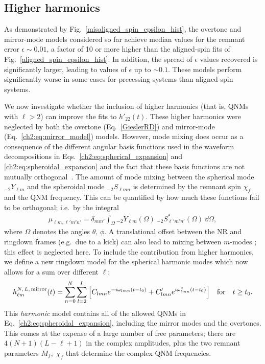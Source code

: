 \subsection{Higher harmonics}\label{kitchen-sink}

As demonstrated by Fig.~\ref{misaligned_spin_epsilon_hist}, %
the overtone and mirror-mode models considered so far achieve median values for the remnant error $\epsilon \sim 0.01$, a factor of 10 or more higher than the aligned-spin fits of Fig.~\ref{aligned_spin_epsilon_hist}. In addition, the spread of $\epsilon$ values recovered is significantly larger, leading to values of $\epsilon$ up to $\sim 0.1$. 
These models perform significantly worse in some cases for precessing systems than aligned-spin systems.

We now investigate whether the inclusion of higher harmonics (that is, QNMs with $\ell > 2$) can improve the fits to $h'_{22}(t)$.
These higher harmonics were neglected by both the overtone (Eq.~\ref{GieslerRD}) and mirror-mode (Eq.~\ref{ch2:eq:mirror_model}) models.
However, mode mixing does occur as a consequence of the different angular basis functions used in the waveform decompositions in Eqs.~\ref{ch2:eq:spherical_expansion} and \ref{ch2:eq:spheroidal_expansion} and the fact that these basis functions are not mutually orthogonal~\cite{Berti:2014fga}.
The amount of mode mixing between the spherical mode ${}_{-2}Y_{\ell m}$ and the spheroidal mode ${}_{-2}S_{\ell m n}$ is determined by the remnant spin $\chi_f$ and the QNM frequency. This can be quantified by how much these functions fail to be orthogonal; i.e.\ by the integral
\begin{align}
     \mu_{\ell m, \ell' m' n'} = \delta_{mm'}\int_{\Omega} {}_{-2}Y_{\ell m}(\Omega)  ~ {}_{-2}S^*_{\ell ' m' n'}(\Omega) ~ \dd{\Omega},
\end{align}
where $\Omega$ denotes the angles $\theta,\,\phi$.
A translational offset between the NR and ringdown frames (e.g.\ due to a kick) can also lead to mixing between $m$-modes \cite{Boyle:2015nqa}; this effect is neglected here.
To include the contribution from higher harmonics, we define a new ringdown model for the spherical harmonic modes which now allows for a sum over different $\ell$:
\begin{equation}\label{full_ringdown}
    h_{\ell m}^{N,\,L,\, {\rm mirror}}(t) = \sum_{n=0}^N \sum_{l=2}^{L} \qty[ C_{l m n} e^{-i \omega_{l m n}(t-t_0)} + C'_{l m n} e^{i \omega^*_{l m n}(t-t_0)} ]\quad \textrm{for} \quad t \geq t_0.
\end{equation}
This \emph{harmonic} model contains all of the allowed QNMs in Eq.~\ref{ch2:eq:spheroidal_expansion}, including the mirror modes and the overtones.
This comes at the expense of a large number of free parameters; there are $4(N+1)(L-\ell+1)$ in the complex amplitudes, plus the two remnant parameters $M_f,\; \chi_f$ that determine the complex QNM frequencies.

